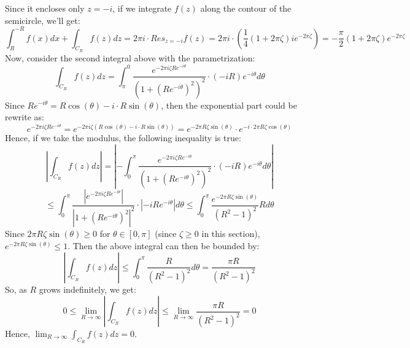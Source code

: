 \documentclass{article}
\begin{document}
\begin{center}
\end{center}

Since it encloses only $z=-i$, if we integrate $f(z)$ along the contour of the semicircle, we'll get:
$$\int_{R}^{-R}f(x)dx + \int_{C_R}f(z)dz = 2\pi i \cdot Res_{z=-i}f(z) = 2\pi i\cdot (\frac{1}{4}(1+2\pi\zeta)ie^{-2\pi\zeta}) = -\frac{\pi}{2}(1+2\pi\zeta)e^{-2\pi\zeta}$$
Now, consider the second integral above with the parametrization:
$$\int_{C_R}f(z)dz = \int_{\pi}^{0}\frac{e^{-2\pi i\zeta Re^{-i\theta}}}{(1+(Re^{-i\theta})^2)^2}\cdot (-iR)e^{-i\theta}d\theta$$
Since $Re^{-i\theta}=R\cos(\theta)-i\cdot R\sin(\theta)$, then the exponential part could be rewrite as:
$$e^{-2\pi i\zeta Re^{-i\theta}} = e^{-2\pi i\zeta (R\cos(\theta)-i\cdot R\sin(\theta))} = e^{-2\pi R\zeta\sin(\theta)}\cdot e^{-i\cdot 2\pi R\zeta\cos(\theta)}$$
Hence, if we take the modulus, the following inequality is true:
$$\left|\int_{C_R}f(z)dz\right| = \left|-\int_{0}^{\pi}\frac{e^{-2\pi i\zeta Re^{-i\theta}}}{(1+(Re^{-i\theta})^2)^2}\cdot (-iR)e^{-i\theta}d\theta\right|$$
$$\leq \int_{0}^{\pi}\frac{|e^{-2\pi i\zeta Re^{-i\theta}}|}{|1+(Re^{-i\theta})^2|^2}\cdot|-iRe^{-i\theta}|d\theta \leq \int_{0}^{\pi}\frac{e^{-2\pi R\zeta \sin(\theta)}}{(R^2-1)^2}R d\theta$$
Since $2\pi R\zeta\sin(\theta)\geq 0$ for $\theta\in [0,\pi]$ (since $\zeta\geq 0$ in this section), $e^{-2\pi R\zeta\sin(\theta)}\leq 1$. Then the above integral can then be bounded by:
$$\left|\int_{C_R}f(z)dz\right|\leq \int_{0}^{\pi}\frac{R}{(R^2-1)^2}d\theta = \frac{\pi R}{(R^2-1)^2}$$
So, as $R$ grows indefinitely, we get:
$$0\leq \lim_{R\rightarrow\infty}\left|\int_{C_R}f(z)dz\right|\leq \lim_{R\rightarrow\infty}\frac{\pi R}{(R^2-1)^2}=0$$
Hence, $\lim_{R\rightarrow\infty}\int_{C_R}f(z)dz=0$.
\end{document}
